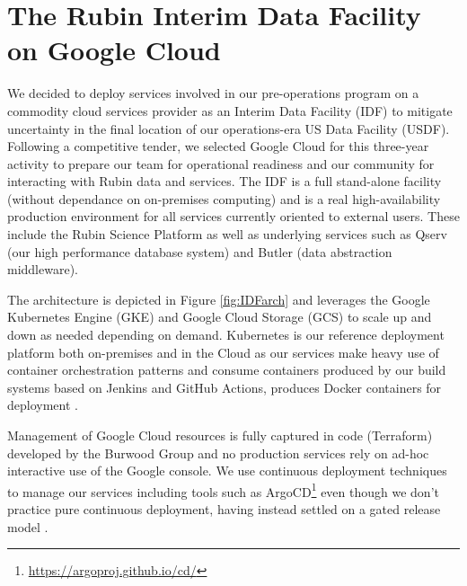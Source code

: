 \documentclass[11pt,twoside]{article}
\begin{document}
\section{The Rubin Interim Data Facility on Google Cloud}

We decided to deploy services involved in our pre-operations program on a commodity cloud services provider as an Interim Data Facility (IDF) to mitigate uncertainty in the final location of our operations-era US Data Facility (USDF).
Following a competitive tender, we selected Google Cloud for this three-year activity to prepare our team for operational readiness and our community for interacting with Rubin data and services.
The IDF is a full stand-alone facility (without dependance on on-premises computing) and is a real high-availability production environment for all services currently oriented to external users. These include the Rubin Science Platform as well as underlying services such as Qserv (our high performance database system) and Butler (data abstraction middleware).

The architecture is depicted in Figure \ref{fig:IDFarch} and leverages the Google Kubernetes Engine (GKE) and Google Cloud Storage (GCS) to scale up and down as needed depending on demand.
Kubernetes is our reference deployment platform both on-premises and in the Cloud as our services make heavy use of container orchestration patterns and consume containers produced by our build systems based on Jenkins and GitHub Actions,  produces Docker containers for deployment \citep[see e.g.,][]{2018SPIE10707E..09J}.

Management of Google Cloud resources is fully captured in code (Terraform) developed by the Burwood Group and no production services rely on ad-hoc interactive use of the Google console. We use continuous deployment techniques to manage our services including tools such as ArgoCD\footnote{\url{https://argoproj.github.io/cd/}} even though we don't practice pure continuous deployment, having instead settled on a gated release model \citep{SQR-056}.

\end{document}
